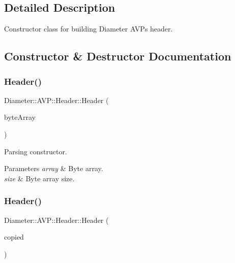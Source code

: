 \subsection{Detailed Description}
Constructor class for building Diameter A\+V\+Ps header. 

\subsection{Constructor \& Destructor Documentation}
\mbox{\label{classDiameter_1_1AVP_1_1Header_ac08a910e8453759d348294223bc35e2f}} 
\subsubsection{\texorpdfstring{Header()}{Header()}\hspace{0.1cm}{\footnotesize\ttfamily [1/2]}}
{\footnotesize\ttfamily Diameter\+::\+A\+V\+P\+::\+Header\+::\+Header (\begin{DoxyParamCaption}\item[{const Byte\+Array \&}]{byte\+Array }\end{DoxyParamCaption})\hspace{0.3cm}{\ttfamily [explicit]}}



Parsing constructor. 


\begin{DoxyParams}{Parameters}
{\em array} & Byte array. \\
\hline
{\em size} & Byte array size. \\
\hline
\end{DoxyParams}
\mbox{\label{classDiameter_1_1AVP_1_1Header_abf6df7b319d97fd308ff42eef0cf3996}} 
\subsubsection{\texorpdfstring{Header()}{Header()}\hspace{0.1cm}{\footnotesize\ttfamily [2/2]}}
{\footnotesize\ttfamily Diameter\+::\+A\+V\+P\+::\+Header\+::\+Header (\begin{DoxyParamCaption}\item[{const \hyperlink{classDiameter_1_1AVP_1_1Header}{Header} \&}]{copied }\end{DoxyParamCaption})}



